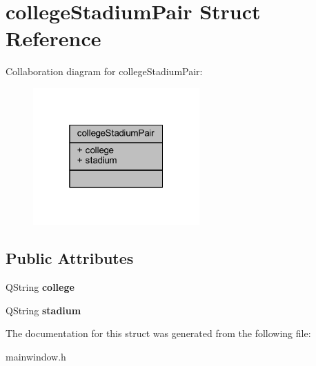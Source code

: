 \hypertarget{structcollege_stadium_pair}{}\section{college\+Stadium\+Pair Struct Reference}
\label{structcollege_stadium_pair}


Collaboration diagram for college\+Stadium\+Pair\+:
\nopagebreak
\begin{figure}[H]
\begin{center}
\leavevmode
\includegraphics[width=181pt]{structcollege_stadium_pair__coll__graph}
\end{center}
\end{figure}
\subsection*{Public Attributes}
\begin{DoxyCompactItemize}
\item 
\mbox{\label{structcollege_stadium_pair_a77ca4473825d5cd624b735a458b307bb}} 
Q\+String {\bfseries college}
\item 
\mbox{\label{structcollege_stadium_pair_a670f797a70b4d32b10c49414aada09ee}} 
Q\+String {\bfseries stadium}
\end{DoxyCompactItemize}


The documentation for this struct was generated from the following file\+:\begin{DoxyCompactItemize}
\item 
mainwindow.\+h\end{DoxyCompactItemize}
